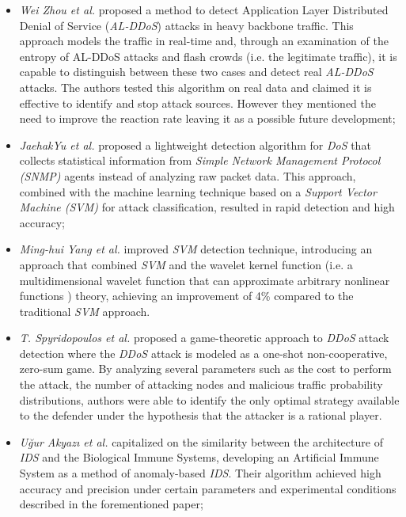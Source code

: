 \begin{itemize}
\item \emph{Wei Zhou et al.} \cite{zhou2014detection} proposed a method to detect Application Layer Distributed Denial of Service (\emph{AL-DDoS}) attacks in heavy backbone traffic. This approach models the traffic in real-time and, through an examination of the entropy of AL-DDoS attacks and flash crowds (i.e. the legitimate traffic), it is capable to distinguish between these two cases and detect real \emph{AL-DDoS} attacks. The authors tested this algorithm on real data and claimed it is effective to identify and stop attack sources. However they mentioned the need to improve the reaction rate leaving it as a possible future development;
\item \emph{JaehakYu et al.} \cite{yu2008traffic} proposed a lightweight detection algorithm for \emph{DoS} that collects statistical information from \emph{Simple Network Management Protocol (SNMP)} agents instead of analyzing raw packet data. This approach, combined with the machine learning technique based on a \emph{Support Vector Machine (SVM)} for attack classification, resulted in rapid detection and high accuracy;
\item \emph{Ming-hui Yang et al.} \cite{yang2008ddos} improved \emph{SVM} detection technique, introducing an approach that combined \emph{SVM} and the wavelet kernel function (i.e. a multidimensional wavelet function that can approximate arbitrary nonlinear functions \cite{zhang2004wavelet}) theory, achieving an improvement of 4\% compared to the traditional \emph{SVM} approach. 
\item \emph{T. Spyridopoulos et al.} \cite{spyridopoulos2013game} proposed a game-theoretic approach to \emph{DDoS} attack detection where the \emph{DDoS} attack is modeled as a one-shot non-cooperative, zero-sum game. By analyzing several parameters such as the cost to perform the attack, the number of attacking nodes and malicious traffic probability distributions, authors were able to identify the only optimal strategy available to the defender under the hypothesis that the attacker is a rational player. 
\item \emph{Uğur Akyazı et al.} \cite{akyazi2010detection} capitalized on the similarity between the architecture of \emph{IDS} and the Biological Immune Systems, developing an Artificial Immune System as a method of anomaly-based \emph{IDS}. Their algorithm achieved high accuracy and precision under certain parameters and experimental conditions described in the forementioned paper;

\end{itemize}

